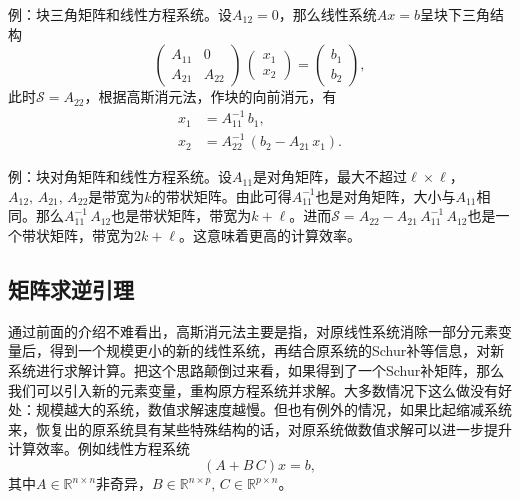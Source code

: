 例：块三角矩阵和线性方程系统。设$A_{12}=0$，那么线性系统$A x = b$呈块下三角结构
\begin{equation*}
  \begin{pmatrix}
    A_{11} & 0 \\
    A_{21} & A_{22}
  \end{pmatrix}
  \,
  \begin{pmatrix}
    x_{1} \\
    x_{2}
  \end{pmatrix}
  =
  \begin{pmatrix}
  b_{1} \\ b_{2}
  \end{pmatrix},
\end{equation*}
此时$\mathcal{S} = A_{22}$，根据高斯消元法，作块的向前消元，有
\begin{equation*}
  \begin{split}
    x_{1} & = A_{11}^{-1} \, b_{1}, \\
    x_{2} & = A_{22}^{-1} \, \left( b_{2} - A_{21} \, x_{1} \right).
  \end{split}
\end{equation*}

例：块对角矩阵和线性方程系统。设$A_{11}$是对角矩阵，最大不超过$\ell \times \ell$，$A_{12}, \, A_{21}, \, A_{22}$是带宽为$k$的带状矩阵。由此可得$A_{11}^{-1}$也是对角矩阵，大小与$A_{11}$相同。那么$A_{11}^{-1} \, A_{12}$也是带状矩阵，带宽为$k + \ell$。进而$\mathcal{S} = A_{22} - A_{21} \, A_{11}^{-1} \, A_{12}$也是一个带状矩阵，带宽为$2 k + \ell$。这意味着更高的计算效率。


\subsection{矩阵求逆引理}
\label{sec:numlin-matrix-inversion-lemma}

通过前面的介绍不难看出，高斯消元法主要是指，对原线性系统消除一部分元素变量后，得到一个规模更小的新的线性系统，再结合原系统的Schur补等信息，对新系统进行求解计算。把这个思路颠倒过来看，如果得到了一个Schur补矩阵，那么我们可以引入新的元素变量，重构原方程系统并求解。大多数情况下这么做没有好处：规模越大的系统，数值求解速度越慢。但也有例外的情况，如果比起缩减系统来，恢复出的原系统具有某些特殊结构的话，对原系统做数值求解可以进一步提升计算效率。例如线性方程系统
\begin{equation}
  \label{eq:numlin-inverse-system-x}
  \left( A + B \, C \right) x = b,
\end{equation}
其中$A \in \mathbb{R}^{n \times n}$非奇异，$B \in \mathbb{R}^{n \times p}, \, C \in \mathbb{R}^{p \times n}$。

